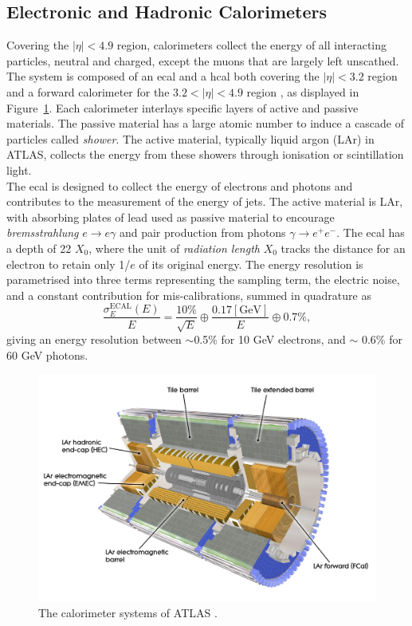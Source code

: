 \subsection{Electronic and Hadronic Calorimeters}
Covering the $|\eta| < 4.9$ region, calorimeters collect the energy of all interacting particles, neutral and charged, except the muons that are largely left unscathed. The system is composed of an \gls{ecal} and a \gls{hcal} both covering the $|\eta| < 3.2$ region and a forward calorimeter for the $3.2 < |\eta| < 4.9$ region \cite{TheATLASCollaboration_2008}, as displayed in Figure~\ref{fig-AtlasDecCalo}. Each calorimeter interlays specific layers of active and passive materials. The passive material has a large atomic number to induce a cascade of particles called \textit{shower}. The active material, typically liquid argon (LAr) in ATLAS, collects the energy from these showers through ionisation or scintillation light.\\

The \gls{ecal} is designed to collect the energy of electrons and photons and contributes to the measurement of the energy of jets. The active material is LAr, with absorbing plates of lead used as passive material to encourage \textit{bremsstrahlung} $e \rightarrow e\gamma$ and pair production from photons $\gamma \rightarrow e^+e^-$. The \gls{ecal} has a depth of 22 $X_0$, where the unit of \textit{radiation length} $X_0$ tracks the distance for an electron to retain only 1/$e$ of its original energy. The energy resolution is parametrised into three terms representing the sampling term, the electric noise, and a constant contribution for mis-calibrations, summed in quadrature as \cite{Cavallari_2011}
\begin{equation}
  \frac{\sigma_E^{\text{ECAL}}(E)}{E} = \frac{10\%}{\sqrt{E}} \oplus \frac{0.17 [\text{GeV}]}{E} \oplus 0.7\%,
\end{equation}
giving an energy resolution between $\sim$0.5\% for 10 GeV electrons, and $\sim$ 0.6\% for 60 GeV photons.\\

\begin{figure}[!h]
  \centering
  \includegraphics[width=\textwidth]{Images/ATLAS/ATLASCalo.jpg}
  \caption{The calorimeter systems of ATLAS \cite{ATLASschematics}.}
  \label{fig-AtlasDecCalo}
\end{figure}


